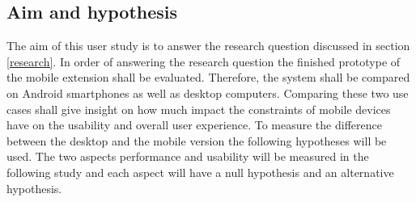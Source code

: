 \subsection{Aim and hypothesis}
\label{aim}
The aim of this user study is to answer the research question discussed in section \ref{research}.
In order of answering the research question the finished prototype of the mobile extension shall be evaluated.
Therefore, the system shall be compared on Android smartphones as well as desktop computers.
Comparing these two use cases shall give insight on how much impact the constraints of mobile devices have on the usability and overall user experience.
To measure the difference between the desktop and the mobile version the following hypotheses will be used.
The two aspects performance and usability will be measured in the following study and each aspect will have a null hypothesis and an alternative hypothesis.
